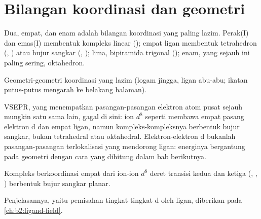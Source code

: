 \section{Bilangan koordinasi dan geometri}

Dua, empat, dan enam adalah bilangan koordinasi yang paling lazim. Perak(I)
dan emas(I) membentuk kompleks linear (\ce{[Ag(NH3)2]+}); empat ligan
membentuk tetrahedron (, ) atau bujur
sangkar (, ); lima, bipiramida trigonal
(); enam, yang sejauh ini paling sering, oktahedron.

\begin{omfigure}

{\small Geometri-geometri koordinasi yang lazim (logam jingga, ligan abu-abu;
ikatan putus-putus mengarah ke belakang halaman).}
\end{omfigure}

VSEPR, yang menempatkan pasangan-pasangan elektron atom pusat sejauh mungkin
satu sama lain, gagal di sini: ion $d^8$ seperti  membawa empat
pasang elektron d dan empat ligan, namun kompleks-kompleksnya berbentuk bujur
sangkar, bukan tetrahedral atau oktahedral. Elektron-elektron d bukanlah
pasangan-pasangan terlokalisasi yang mendorong ligan: energinya bergantung
pada geometri dengan cara yang dihitung dalam bab berikutnya.

\begin{proposition}\label{prop:b2:coordination-complexes:square-planar}
Kompleks berkoordinasi empat dari ion-ion $d^8$ deret transisi kedua dan
ketiga (, , ) berbentuk bujur sangkar planar.
\end{proposition}

\admitted

Penjelasannya, yaitu pemisahan tingkat-tingkat d oleh ligan, diberikan pada
\cref{ch:b2:ligand-field}.

